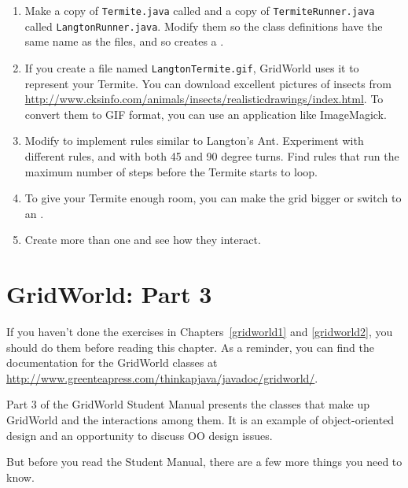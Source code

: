 \begin{exercise}

\begin{enumerate}

\item Make a copy of {\tt Termite.java} called  and a copy of {\tt TermiteRunner.java} called {\tt LangtonRunner.java}.
Modify them so the class definitions have the same name as the files, and so  creates a .

\item If you create a file named {\tt LangtonTermite.gif}, GridWorld uses it to represent your Termite.
You can download excellent pictures of insects from \url{http://www.cksinfo.com/animals/insects/realisticdrawings/index.html}.
To convert them to GIF format, you can use an application like ImageMagick.

\item Modify  to implement rules similar to Langton's Ant.
Experiment with different rules, and with both 45 and 90 degree turns.
Find rules that run the maximum number of steps before the Termite starts to loop.

\item To give your Termite enough room, you can make the grid bigger or switch to an .

\item Create more than one  and see how they interact.

\end{enumerate}

\end{exercise}


\chapter{GridWorld: Part 3}
\label{gridworld3}

If you haven't done the exercises in Chapters~\ref{gridworld1} and \ref{gridworld2}, you should do them before reading this chapter.
As a reminder, you can find the documentation for the GridWorld classes at \url{http://www.greenteapress.com/thinkapjava/javadoc/gridworld/}.

Part 3 of the GridWorld Student Manual presents the classes that make up GridWorld and the interactions among them.
It is an example of object-oriented design and an opportunity to discuss OO design issues.

But before you read the Student Manual, there are a few more things you need to know.



